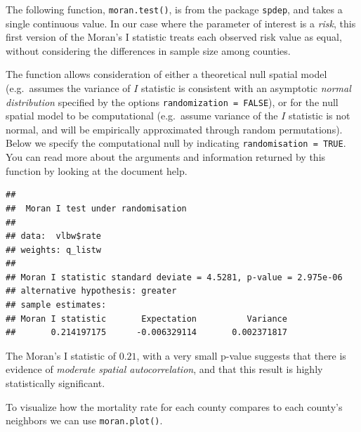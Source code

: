 \documentclass[
]{book}
\newenvironment{Shaded}{\begin{snugshade}}{\end{snugshade}}
\newcommand{\AttributeTok}[1]{\textcolor[rgb]{0.13,0.29,0.53}{#1}}
\newcommand{\FunctionTok}[1]{\textcolor[rgb]{0.13,0.29,0.53}{\textbf{#1}}}
\newcommand{\NormalTok}[1]{#1}
\newcommand{\SpecialCharTok}[1]{\textcolor[rgb]{0.81,0.36,0.00}{\textbf{#1}}}
\newcommand{\StringTok}[1]{\textcolor[rgb]{0.31,0.60,0.02}{#1}}
\begin{document}
The following function, \texttt{moran.test()}, is from the package \texttt{spdep}, and takes a single continuous value. In our case where the parameter of interest is a \emph{risk}, this first version of the Moran's I statistic treats each observed risk value as equal, without considering the differences in sample size among counties.

The function allows consideration of either a theoretical null spatial model (e.g.~assumes the variance of \(I\) statistic is consistent with an asymptotic \emph{normal distribution} specified by the options \texttt{randomization\ =\ FALSE}), or for the null spatial model to be computational (e.g.~assume variance of the \(I\) statistic is not normal, and will be empirically approximated through random permutations). Below we specify the computational null by indicating \texttt{randomisation\ =\ TRUE}. You can read more about the arguments and information returned by this function by looking at the document help.

\begin{Shaded}
\end{Shaded}

\begin{verbatim}
## 
##  Moran I test under randomisation
## 
## data:  vlbw$rate  
## weights: q_listw    
## 
## Moran I statistic standard deviate = 4.5281, p-value = 2.975e-06
## alternative hypothesis: greater
## sample estimates:
## Moran I statistic       Expectation          Variance 
##       0.214197175      -0.006329114       0.002371817
\end{verbatim}

The Moran's I statistic of \(0.21\), with a very small p-value suggests that there is evidence of \emph{moderate spatial autocorrelation}, and that this result is highly statistically significant.

To visualize how the mortality rate for each county compares to each county's neighbors we can use \texttt{moran.plot()}.

\begin{Shaded}
\end{Shaded}
\end{document}
